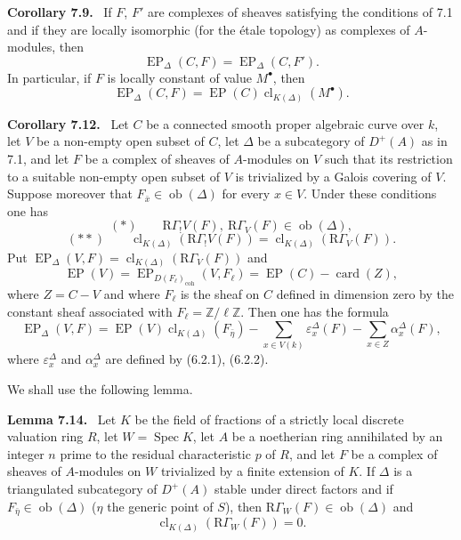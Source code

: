 \documentclass[11pt]{article}
\newenvironment{statement}[1]{\par\medskip\noindent\textbf{#1.}\ }{\par\medskip}
\DeclareMathOperator{\Spec}{Spec}
\providecommand{\EP}{\operatorname{EP}}
\providecommand{\coh}{\mathrm{coh}}
\providecommand{\Ob}{\operatorname{ob}}
\providecommand{\Ob}{\operatorname{ob}}
\providecommand{\Spec}{\operatorname{Spec}}
\providecommand{\EP}{\operatorname{EP}}
\providecommand{\Spec}{\operatorname{Spec}}
\providecommand{\Ob}{\operatorname{Ob}}
\providecommand{\coh}{\mathrm{coh}}
\providecommand{\clK}[1]{\operatorname{cl}_{K(#1)}}
\providecommand{\RG}{\mathrm R\Gamma}
\providecommand{\Spec}{\operatorname{Spec}}
\providecommand{\Ob}{\operatorname{ob}}
\begin{document}
\begin{statement}{Corollary 7.9}
If $F$, $F'$ are complexes of sheaves satisfying the conditions of 7.1 and if they are locally isomorphic (for the étale topology) as complexes of $A$-modules, then
\[
\EP_\Delta(C,F)=\EP_\Delta(C,F').
\tag{7.10}
\]
In particular, if $F$ is locally constant of value $M^\bullet$, then
\[
\EP_\Delta(C,F)=\EP(C)\clK{\Delta}(M^\bullet).
\tag{7.11}
\]
\end{statement}

\begin{statement}{Corollary 7.12}
Let $C$ be a connected smooth proper algebraic curve over $k$, let $V$ be a non-empty open subset of $C$, let $\Delta$ be a subcategory of $D^+(A)$ as in 7.1, and let $F$ be a complex of sheaves of $A$-modules on $V$ such that its restriction to a suitable non-empty open subset of $V$ is trivialized by a Galois covering of $V$. Suppose moreover that $F_{\bar x}\in\Ob(\Delta)$ for every $x\in V$. Under these conditions one has
\[
(*)\qquad \RG_!V(F),\ \RG_V(F)\in\Ob(\Delta),
\]
\[
(**)\qquad
\clK{\Delta}(\RG_!V(F))=\clK{\Delta}(\RG_V(F)).
\]
Put $\EP_\Delta(V,F)=\clK{\Delta}(\RG_V(F))$ and
\[
\EP(V)=\EP_{D(F_\ell)_{\coh}}(V,F_\ell)=\EP(C)-\operatorname{card}(Z),
\]
where $Z=C-V$ and where $F_\ell$ is the sheaf on $C$ defined in dimension zero by the constant sheaf associated with $F_\ell=\mathbb Z/\ell\mathbb Z$. Then one has the formula
\[
\EP_\Delta(V,F)
=
\EP(V)\clK{\Delta}(F_{\bar\eta})
-\sum_{x\in V(k)}\varepsilon_x^\Delta(F)
-\sum_{x\in Z}\alpha_x^\Delta(F),
\tag{7.13}
\]
where $\varepsilon_x^\Delta$ and $\alpha_x^\Delta$ are defined by (6.2.1), (6.2.2).
\end{statement}

We shall use the following lemma.

\begin{statement}{Lemma 7.14}
Let $K$ be the field of fractions of a strictly local discrete valuation ring $R$, let $W=\Spec K$, let $A$ be a noetherian ring annihilated by an integer $n$ prime to the residual characteristic $p$ of $R$, and let $F$ be a complex of sheaves of $A$-modules on $W$ trivialized by a finite extension of $K$. If $\Delta$ is a triangulated subcategory of $D^+(A)$ stable under direct factors and if $F_{\bar\eta}\in\Ob(\Delta)$ ($\eta$ the generic point of $S$), then $\RG_W(F)\in\Ob(\Delta)$ and
\[
\clK{\Delta}(\RG_W(F))=0.
\]
\end{statement}
\end{document}
